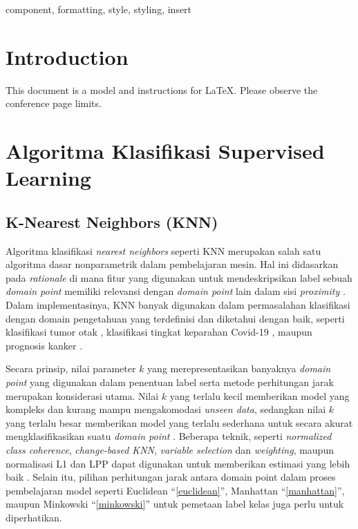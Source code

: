 \documentclass[conference]{IEEEtran}
\begin{document}
\begin{abstract}
This document is a model and instructions for \LaTeX.
This and the IEEEtran.cls file define the components of your paper [title, text, heads, etc.]. *CRITICAL: Do Not Use Symbols, Special Characters, Footnotes, 
or Math in Paper Title or Abstract.
\end{abstract}

\begin{IEEEkeywords}
component, formatting, style, styling, insert
\end{IEEEkeywords}

\section{Introduction}
This document is a model and instructions for \LaTeX.
Please observe the conference page limits. 

\section{Algoritma Klasifikasi Supervised Learning}

\subsection{K-Nearest Neighbors (KNN)}

Algoritma klasifikasi \textit{nearest neighbors} seperti KNN merupakan salah satu algoritma dasar nonparametrik 
dalam pembelajaran mesin. Hal ini didasarkan pada \textit{rationale} di mana fitur yang digunakan untuk 
mendeskripsikan label sebuah \textit{domain point} memiliki relevansi dengan \textit{domain point} lain dalam sisi 
\textit{proximity} \cite{b4, b5}. Dalam implementasinya, KNN banyak digunakan dalam permasalahan 
klasifikasi dengan domain pengetahuan yang terdefinisi dan diketahui dengan baik, 
seperti klasifikasi tumor otak \cite{b6}, klasifikasi tingkat keparahan Covid-19 \cite{b7}, maupun prognosis kanker \cite{b8}.

Secara prinsip, nilai parameter $k$ yang merepresentasikan banyaknya \textit{domain point} yang digunakan 
dalam penentuan label serta metode perhitungan jarak merupakan konsiderasi utama. Nilai $k$ yang
terlalu kecil memberikan model yang kompleks dan kurang mampu mengakomodasi \textit{unseen data}, sedangkan 
nilai $k$ yang terlalu besar memberikan model yang terlalu sederhana untuk secara akurat 
mengklasifikasikan suatu \textit{domain point} \cite{b9}. Beberapa teknik, seperti \textit{normalized class coherence}, 
\textit{change-based KNN}, \textit{variable selection} dan \textit{weighting}, maupun normalisasi L1 dan LPP dapat digunakan untuk 
memberikan estimasi yang lebih baik \cite{b10,b11,b12}. Selain itu, pilihan perhitungan jarak antara domain point 
dalam proses pembelajaran model seperti Euclidean ``\eqref{euclidean}'', Manhattan ``\eqref{manhattan}'', maupun Minkowski ``\eqref{minkowski}'' untuk pemetaan label kelas 
juga perlu untuk diperhatikan.
\end{document}
